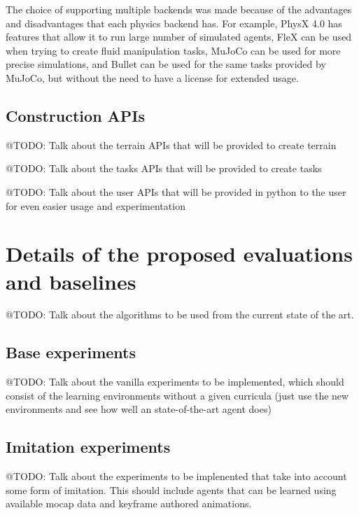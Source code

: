 


The choice of supporting multiple backends was made because of the advantages and
disadvantages that each physics backend has. For example, PhysX 4.0 has features that
allow it to run large number of simulated agents, FleX can be used when trying to
create fluid manipulation tasks, MuJoCo can be used for more precise simulations, and
Bullet can be used for the same tasks provided by MuJoCo, but without the need to have
a license for extended usage.

\subsection{Construction APIs}

@TODO: Talk about the terrain APIs that will be provided to create terrain

@TODO: Talk about the tasks APIs that will be provided to create tasks

@TODO: Talk about the user APIs that will be provided in python to the user for
       even easier usage and experimentation

\section{Details of the proposed evaluations and baselines}

@TODO: Talk about the algorithms to be used from the current state of the art.

\subsection{Base experiments}

@TODO: Talk about the vanilla experiments to be implemented, which should
       consist of the learning environments without a given curricula (just use
       the new environments and see how well an state-of-the-art agent does)

\subsection{Imitation experiments}

@TODO: Talk about the experiments to be implenented that take into account some
       form of imitation. This should include agents that can be learned using 
       available mocap data and keyframe authored animations.

